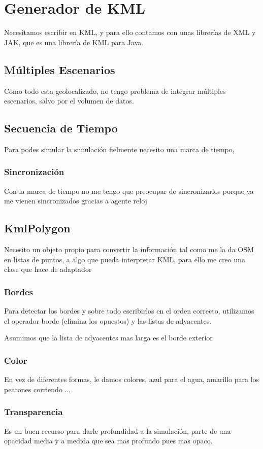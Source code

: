 \section*{Generador de KML}
Necesitamos escribir en KML, y para ello contamos con unas librerías de XML y
JAK, que es una librería de KML para Java.
\subsection*{Múltiples Escenarios}
Como todo esta geolocalizado, no tengo problema de integrar múltiples
escenarios, salvo por el volumen de datos.
\subsection*{Secuencia de Tiempo}
Para podes simular la simulación fielmente necesito una marca de tiempo, 
\subsubsection*{Sincronización}
Con la marca de tiempo no me tengo que preocupar de sincronizarlos porque ya me
vienen sincronizados gracias a agente reloj
\subsection*{KmlPolygon}
Necesito un objeto propio para convertir la información tal como me la da OSM
en listas de puntos, a algo que pueda interpretar KML, para ello me creo una
clase que hace de adaptador
\subsubsection*{Bordes}
Para detectar los bordes y sobre todo escribirlos en el orden correcto,
utilizamos el operador borde (elimina los opuestos) y las listas de adyacentes.

Asumimos que la lista de adyacentes mas larga es el borde exterior
\subsubsection*{Color}
En vez de diferentes formas, le damos colores, azul para el agua, amarillo para
los peatones corriendo ...
\subsubsection*{Transparencia}
Es un buen recurso para darle profundidad a la simulación, parte de una
opacidad media y a medida que sea mas profundo pues mas opaco.

